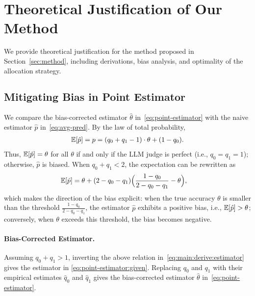 

\section{Theoretical Justification of Our Method}
\label{sec:theory}

We provide theoretical justification for the method proposed in Section~\ref{sec:method}, including derivations, bias analysis, and optimality of the allocation strategy.

\subsection{Mitigating Bias in Point Estimator}

We compare the bias-corrected estimator $\hat{\theta}$ in~\eqref{eq:point-estimator} with the naive estimator $\hat{p}$ in~\eqref{eq:avg-pred}.
By the law of total probability,
\begin{align}
    \label{eq:main:derive:estimator}
    \displaystyle \mathbb{E}[\hat{p}] = p
    = (q_0 + q_1 - 1) \cdot \theta + (1 - q_0)
    .
\end{align}
Thus, $\displaystyle \mathbb{E}[\hat{p}] = \theta$ for all $\theta$ if and only if the LLM judge is perfect (i.e., $q_0 = q_1 = 1$); otherwise, $\hat{p}$ is biased. When $q_0 + q_1 < 2$, the expectation can be rewritten as
\begin{align}
    \displaystyle \mathbb{E}[\hat{p}]
    &= \theta + (2 - q_0 - q_1)\Big( \frac{1 - q_0}{2 - q_0 - q_1} - \theta \Big),
\end{align}
which makes the direction of the bias explicit: when the true accuracy $\theta$ is smaller than the threshold $\tfrac{1 - q_0}{2 - q_0 - q_1}$, the estimator $\hat{p}$ exhibits a positive bias, i.e., $\displaystyle \mathbb{E}[\hat{p}] > \theta$; conversely, when $\theta$ exceeds this threshold, the bias becomes negative.

\paragraph{Bias-Corrected Estimator.}
Assuming $q_0 + q_1 > 1$, inverting the above relation in~\eqref{eq:main:derive:estimator} gives the estimator in \eqref{eq:point-estimator:given}.
Replacing $q_0$ and $q_1$ with their empirical estimates $\hat{q}_0$ and $\hat{q}_1$ gives the bias-corrected estimator $\hat{\theta}$ in~\eqref{eq:point-estimator}.

